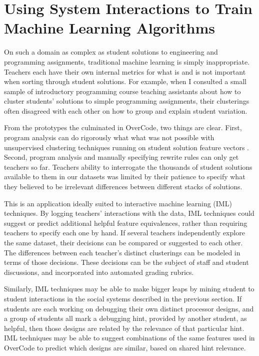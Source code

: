 \documentclass{sigchi}
\begin{document}
\section{Using System Interactions to Train Machine Learning Algorithms}

On such a domain as complex as student solutions to engineering and programming assignments, traditional machine learning is simply inappropriate. Teachers each have their own internal metrics for what is and is not important when sorting through student solutions. For example, when I consulted a small sample of introductory programming course teaching assistants about how to cluster students' solutions to simple programming assignments, their clusterings often disagreed with each other on how to group and explain student variation.

From the prototypes the culminated in OverCode, two things are clear. First, program analysis can do rigorously what what was not possible with unsupervised clustering techniques running on student solution feature vectors  \cite{GlassmanCHIWkshop}. Second, program analysis and manually specifying rewrite rules can only get teachers so far. Teachers ability to interrogate the thousands of student solutions available to them in our datasets was limited by their patience to specify what they believed to be irrelevant differences between different stacks of solutions. 

This is an application ideally suited to interactive machine learning (IML) techniques. By logging teachers' interactions with the data, IML techniques could suggest or predict additional helpful feature equivalences, rather than requiring teachers to specify each one by hand. If several teachers independently explore the same dataset, their decisions can be compared or suggested to each other. The differences between each teacher's distinct clusterings can be modeled in terms of those decisions. These decisions can be the subject of staff and student discussions, and incorporated into automated grading rubrics. 

Similarly, IML techniques may be able to make bigger leaps by mining student to student interactions in the social systems described in the previous section. If students are each working on debugging their own distinct processor designs, and a group of students all mark a debugging hint, provided by another student, as helpful, then those designs are related by the relevance of that particular hint. IML techniques may be able to suggest combinations of the same features used in OverCode to predict which designs are similar, based on shared hint relevance.
\end{document}
